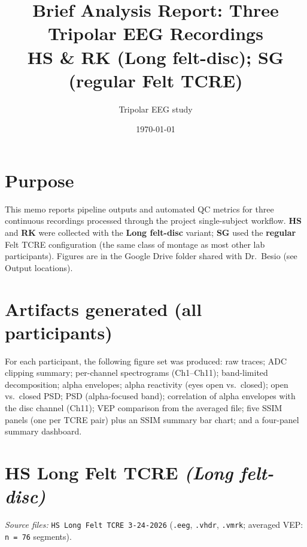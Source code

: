 \documentclass[11pt]{article}
\title{Brief Analysis Report: Three Tripolar EEG Recordings\\{\large HS \& RK (Long felt-disc); SG (regular Felt TCRE)}}
\author{Tripolar EEG study}
\date{\today}
\begin{document}
\maketitle

\section*{Purpose}
This memo reports pipeline outputs and automated QC metrics for three continuous recordings processed through the project single-subject workflow. \textbf{HS} and \textbf{RK} were collected with the \textbf{Long felt-disc} variant; \textbf{SG} used the \textbf{regular} Felt TCRE configuration (the same class of montage as most other lab participants). Figures are in the Google Drive folder shared with Dr.\ Besio (see Output locations).

\section*{Artifacts generated (all participants)}
For each participant, the following figure set was produced: raw traces; ADC clipping summary; per-channel spectrograms (Ch1--Ch11); band-limited decomposition; alpha envelopes; alpha reactivity (eyes open vs.\ closed); open vs.\ closed PSD; PSD (alpha-focused band); correlation of alpha envelopes with the disc channel (Ch11); VEP comparison from the averaged file; five SSIM panels (one per TCRE pair) plus an SSIM summary bar chart; and a four-panel summary dashboard.

\section*{HS Long Felt TCRE \textnormal{\textit{(Long felt-disc)}}}
\textit{Source files:} \texttt{HS Long Felt TCRE 3-24-2026} (\texttt{.eeg}, \texttt{.vhdr}, \texttt{.vmrk}; averaged VEP: \texttt{n\,=\,76} segments).
\end{document}
